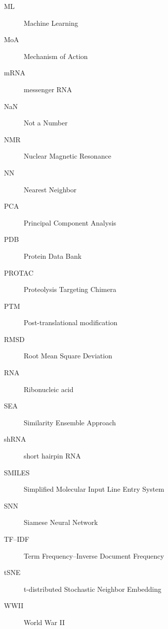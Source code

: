 \begin{description}
    \item[ML] Machine Learning
    \item[MoA] Mechanism of Action
    \item[mRNA] messenger RNA
    \item[NaN] Not a Number
    \item[NMR] Nuclear Magnetic Resonance
    \item[NN] Nearest Neighbor
    \item[PCA] Principal Component Analysis
    \item[PDB] Protein Data Bank
    \item[PROTAC] Proteolysis Targeting Chimera
    \item[PTM] Post-translational modification
    \item[RMSD] Root Mean Square Deviation
    \item[RNA] Ribonucleic acid
    \item[SEA] Similarity Ensemble Approach
    \item[shRNA] short hairpin RNA
    \item[SMILES] Simplified Molecular Input Line Entry System
    \item[SNN] Siamese Neural Network
    \item[TF–IDF] Term Frequency–Inverse Document Frequency
    \item[tSNE] t-distributed Stochastic Neighbor Embedding
    \item[WWII] World War II
\end{description}

